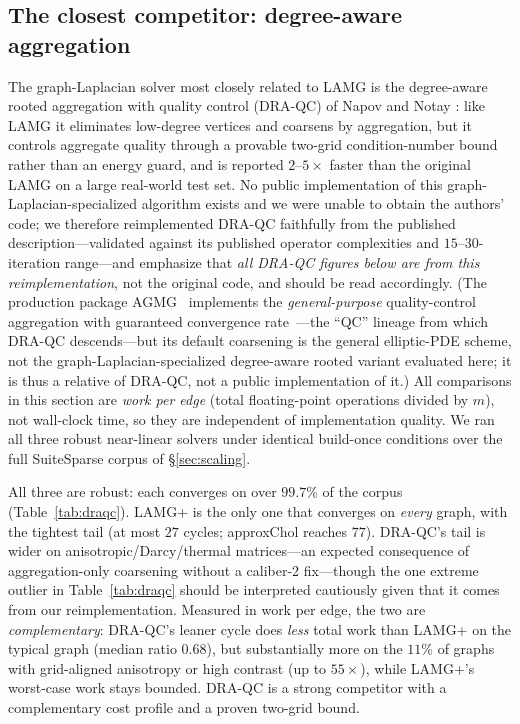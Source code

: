 \documentclass[leqno,letterpaper]{etna}
\begin{document}
\subsection{The closest competitor: degree-aware aggregation}\label{sec:draqc}
The graph-Laplacian solver most closely related to LAMG is the degree-aware rooted aggregation
with quality control (DRA-QC) of Napov and Notay \cite{napov-notay}: like LAMG it eliminates
low-degree vertices and coarsens by aggregation, but it controls aggregate quality through a
provable two-grid condition-number bound rather than an energy guard, and is reported $2$--$5\times$
faster than the original LAMG on a large real-world test set. No public implementation of this
graph-Laplacian-specialized algorithm exists and we were unable to obtain the authors' code; we
therefore reimplemented DRA-QC faithfully from the
published description---validated against its published operator complexities and
$15$--$30$-iteration range---and emphasize that \emph{all DRA-QC figures below are from this
reimplementation}, not the original code, and should be read accordingly.
(The production package AGMG~\cite{agmg} implements the \emph{general-purpose} quality-control
aggregation with guaranteed convergence rate~\cite{napov-notay-2012}---the ``QC'' lineage from which
DRA-QC descends---but its default coarsening is the general elliptic-PDE scheme, not the
graph-Laplacian-specialized degree-aware rooted variant evaluated here; it is thus a relative of
DRA-QC, not a public implementation of it.) All comparisons in this
section are \emph{work per edge} (total floating-point operations divided by $m$), not wall-clock
time, so they are independent of implementation quality. We ran all three robust near-linear
solvers under identical build-once conditions over the full SuiteSparse corpus of \S\ref{sec:scaling}.

All three are robust: each converges on over $99.7\%$ of the corpus
(Table~\ref{tab:draqc}). LAMG+ is the only one that converges on \emph{every} graph, with the
tightest tail (at most $27$ cycles; approxChol reaches $77$). DRA-QC's tail is wider on
anisotropic/Darcy/thermal matrices---an expected consequence of aggregation-only coarsening without
a caliber-2 fix---though the one extreme outlier in Table~\ref{tab:draqc} should be interpreted
cautiously given that it comes from our reimplementation. Measured in work per edge,
the two are \emph{complementary}: DRA-QC's leaner cycle does \emph{less} total work than LAMG+ on the
typical graph (median ratio $0.68$), but substantially more on the $11\%$ of graphs with grid-aligned
anisotropy or high contrast (up to $55\times$), while LAMG+'s worst-case work stays bounded.
DRA-QC is a strong competitor with a complementary cost profile and a proven two-grid bound.
\end{document}
